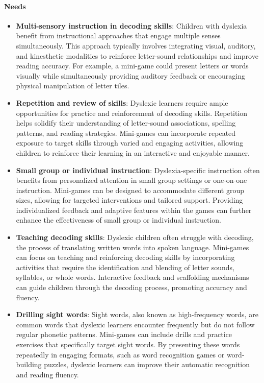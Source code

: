 \paragraph{\textbf{Needs}}
\begin{itemize}
    \item \textbf{Multi-sensory instruction in decoding skills}: Children with dyslexia benefit from instructional approaches that engage multiple senses simultaneously. This approach typically involves integrating visual, auditory, and kinesthetic modalities to reinforce letter-sound relationships and improve reading accuracy. For example, a mini-game could present letters or words visually while simultaneously providing auditory feedback or encouraging physical manipulation of letter tiles. \cite{dyslexiaUnderstanding}
    \item \textbf{Repetition and review of skills}: Dyslexic learners require ample opportunities for practice and reinforcement of decoding skills. Repetition helps solidify their understanding of letter-sound associations, spelling patterns, and reading strategies. Mini-games can incorporate repeated exposure to target skills through varied and engaging activities, allowing children to reinforce their learning in an interactive and enjoyable manner. \cite{dyslexiaUnderstanding}
    \item \textbf{Small group or individual instruction}: Dyslexia-specific instruction often benefits from personalized attention in small group settings or one-on-one instruction. Mini-games can be designed to accommodate different group sizes, allowing for targeted interventions and tailored support. Providing individualized feedback and adaptive features within the games can further enhance the effectiveness of small group or individual instruction. \cite{dyslexiaUnderstanding}
    \item \textbf{Teaching decoding skills}: Dyslexic children often struggle with decoding, the process of translating written words into spoken language. Mini-games can focus on teaching and reinforcing decoding skills by incorporating activities that require the identification and blending of letter sounds, syllables, or whole words. Interactive feedback and scaffolding mechanisms can guide children through the decoding process, promoting accuracy and fluency. \cite{dyslexiaUnderstanding}
    \item \textbf{Drilling sight words}: Sight words, also known as high-frequency words, are common words that dyslexic learners encounter frequently but do not follow regular phonetic patterns. Mini-games can include drills and practice exercises that specifically target sight words. By presenting these words repeatedly in engaging formats, such as word recognition games or word-building puzzles, dyslexic learners can improve their automatic recognition and reading fluency. \cite{dyslexiaUnderstanding}

\end{itemize}
